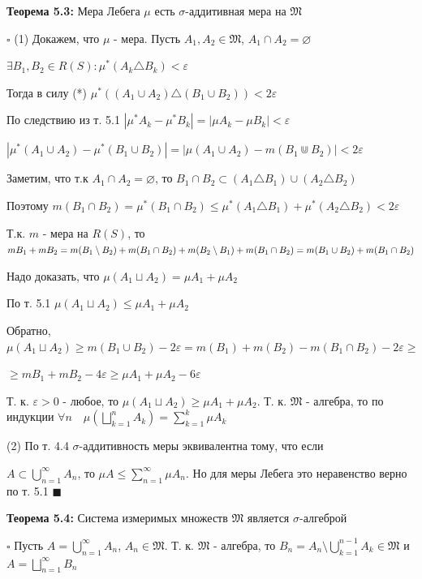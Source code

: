 \documentclass[a4paper]{report}
\newcommand*{\hm}[1]{#1\nobreak\discretionary{}%
            {\hbox{$\mathsurround=0pt #1$}}{}}
\begin{document}
\noindent\textbf{Теорема 5.3:} Мера Лебега $\mu$ есть $\sigma$-аддитивная мера на $\mathfrak M$

\noindent $\square$ (1) Докажем, что $\mu$ - мера. Пусть $A_1,A_2\in\mathfrak M$, $A_1\cap A_2=\varnothing$

$\exists B_1,B_2\in R(S)\colon\mu^*(A_k\triangle B_k)<\varepsilon$

Тогда в силу (*) $\mu^*\left((A_1\cup A_2)\triangle (B_1\cup B_2)\right)<2\varepsilon$

По следствию из т. 5.1 $|\mu^*A_k-\mu^*B_k|=|\mu A_k-\mu B_k|<\varepsilon$

$|\mu^*(A_1\cup A_2)-\mu^*(B_1\cup B_2)|=|\mu(A_1\cup A_2)-m(B_1\Cup B_2)|<2\varepsilon$

Заметим, что т.к $A_1\cap A_2=\varnothing$, то $B_1\cap B_2\subset(A_1\triangle B_1)\cup(A_2\triangle B_2)$

Поэтому $m(B_1\cap B_2)=\mu^*(B_1\cap B_2)\le\mu^*(A_1\triangle B_1)+\mu^*(A_2\triangle B_2)<2\varepsilon$

Т.к. $m$ - мера на $R(S)$, то $mB_1+mB_2=m(B_1\setminus B_2)+m(B_1\cap B_2)+m(B_2\hm\setminus B_1)+m(B_1\cap B_2)=
m(B_1\cup B_2)+m(B_1\cap B_2)$

Надо доказать, что $\mu(A_1\sqcup A_2)=\mu A_1+\mu A_2$ 

По т. 5.1 $\mu(A_1\sqcup A_2)\le\mu A_1+\mu A_2$

Обратно, $\mu(A_1\sqcup A_2)\ge m(B_1\cup B_2)-2\varepsilon=m(B_1)+m(B_2)-m(B_1\cap B_2)-2\varepsilon\ge$

\noindent$\ge mB_1+mB_2-4\varepsilon\ge\mu A_1+\mu A_2-6\varepsilon$

Т. к. $\varepsilon>0$ - любое, то $\mu(A_1\sqcup A_2)\ge \mu A_1+\mu A_2$. Т. к. $\mathfrak M$ - алгебра, то по индукции
$\forall n\quad\mu(\bigsqcup\limits_{k=1}^n A_k)=\sum\limits_{k=1}^k\mu A_k$

(2) По т. 4.4 $\sigma$-аддитивность меры эквивалентна тому, что если 

$A\subset\bigcup\limits_{n=1}^\infty A_n$, то 
$\mu A\le\sum\limits_{n=1}^\infty \mu A_n$. Но для меры Лебега это неравенство верно по т. 5.1 $\blacksquare$
\bigskip

\noindent\textbf{Теорема 5.4:} Система измеримых множеств $\mathfrak M$ является $\sigma$-алгеброй

\noindent $\square$ Пусть $A=\bigcup\limits_{n=1}^\infty A_n$, $A_n\in\mathfrak M$. Т. к. $\mathfrak M$ - алгебра, то 
$B_n=A_n\setminus\bigcup\limits_{k=1}^{n-1} A_k\in\mathfrak M$ и $A=\bigsqcup\limits_{n=1}^\infty B_n$
\end{document}
